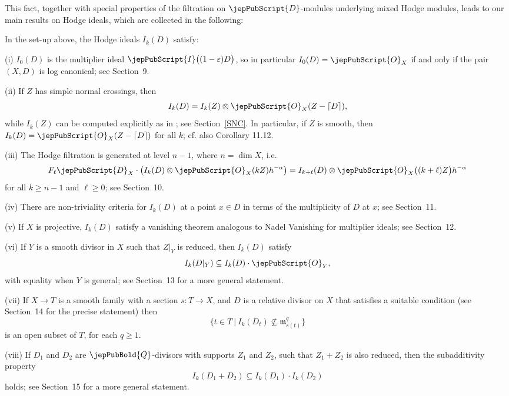This fact, together with special properties of the filtration on $\jepPubScript{D}$-modules underlying mixed Hodge modules, leads to 
our main results on Hodge ideals, which are collected in the following:

\begin{intro-theorem}\label{main_list}
In the set-up above, the Hodge ideals $I_k (D)$ satisfy:


\noindent
(i) $I_0 (D)$ is the multiplier ideal $\jepPubScript{I} \big((1 - \varepsilon)D\big)$, 
so in particular $I_0 (D) = \jepPubScript{O}_X$ if and only if the pair $(X, D)$ is log canonical; see Section~9.


\noindent
(ii) If $Z$ has simple normal crossings, then 
$$I_k (D) = I_k (Z) \otimes \jepPubScript{O}_X (Z - \lceil D \rceil),$$
while $I_k (Z)$ can be computed explicitly as in \cite[Prop.~8.2]{MP1}; see Section~\ref{SNC}.  In particular, if 
$Z$ is smooth, then $I_k (D) = \jepPubScript{O}_X (Z - \lceil D \rceil)$ for all $k$; cf. also Corollary 11.12.



\noindent
(iii) The Hodge filtration is generated at level $n-1$, where $n = \dim X$, i.e. 
$$F_\ell \jepPubScript{D}_X\cdot\big(I_k(D)\otimes \jepPubScript{O}_X(kZ)h^{-\alpha}\big) = I_{k+\ell}(D)\otimes \jepPubScript{O}_X \big((k+\ell)Z\big)h^{-\alpha}$$
for all $k \geqslant n-1$ and $\ell\geqslant 0$; see Section~10.


\noindent
(iv) There are non-triviality criteria for $I_k (D)$ at a point $x \in D$ in terms of the multiplicity of $D$ at $x$; 
see Section~11.



\noindent
(v) If $X$ is projective, $I_k(D)$ satisfy a vanishing theorem analogous to Nadel Vanishing for multiplier ideals; 
see Section~12.


\noindent
(vi) If $Y$ is a smooth divisor in $X$ such that $Z|_Y$ is reduced, then $I_k (D)$ satisfy 
$$I_k (D|_Y) \subseteq I_k(D) \cdot \jepPubScript{O}_Y,$$
with equality when $Y$ is general; see Section~13 for a more general statement.


\noindent
(vii) If $ X \to T$ is a smooth family with a section $s\colon T \to X$, and $D$ is a relative divisor on $X$ that satisfies a suitable condition
(see Section~14 for the precise statement) then 
$$\{ t \in T ~|~ I_k (D_t) \not\subseteq \mathfrak{m}_{s(t)}^q\}$$
is an open subset of $T$, for each $q \geqslant 1$.



\noindent
(viii) If $D_1$ and $D_2$ are $\jepPubBold{Q}$-divisors with supports $Z_1$ and $Z_2$, such that $Z_1 +  Z_2$ is also reduced, then  the subadditivity property
$$I_k (D_1 + D_2) \subseteq I_k (D_1)\cdot I_k (D_2)$$
holds; see Section~15 for a more general statement.
\end{intro-theorem}


